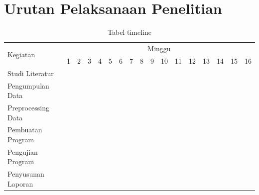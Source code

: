 \section{Urutan Pelaksanaan Penelitian}
\newcommand{\w}{}
\newcommand{\G}{\cellcolor{gray}}
\begin{table}[h!]
  \caption{Tabel timeline}
  \label{tb:timeline}
  \begin{tabular}{|p{3.5cm}|c|c|c|c|c|c|c|c|c|c|c|c|c|c|c|c|}

    \hline
    \multirow{2}{*}{Kegiatan} & \multicolumn{16}{|c|}{Minggu} \\
    \cline{2-17} &
    1 & 2 & 3 & 4 & 5 & 6 & 7 & 8 & 9 & 10 & 11 & 12 & 13 & 14 & 15 & 16 \\
    \hline

    Studi Literatur &
    \G & \G & \w & \w & \w & \w & \w & \w & \w & \w & \w & \w & \w & \w & \w & \w \\
    \hline

    Pengumpulan Data &
    \w & \G & \G & \w & \w & \w & \w & \w & \w & \w & \w & \w & \w & \w & \w & \w \\
    \hline

    Preprocessing Data &
    \w & \w & \G & \G & \G & \w & \w & \w & \w & \w & \w & \w & \w & \w & \w & \w \\
    \hline

    Pembuatan Program &
    \w & \w & \w & \w & \G & \G & \G & \G & \G & \G & \G & \G & \w & \w & \w & \w \\
    \hline

    Pengujian Program &
    \w & \w & \w & \w & \w & \w & \w & \w & \w & \w & \w & \G & \G & \G & \w & \w \\
    \hline

    Penyusunan \linebreak Laporan &
    \G & \G & \G & \G & \G & \G & \G & \G & \G & \G & \G & \G & \G & \G & \G & \G \\
    \hline

  \end{tabular}
\end{table}





% 

